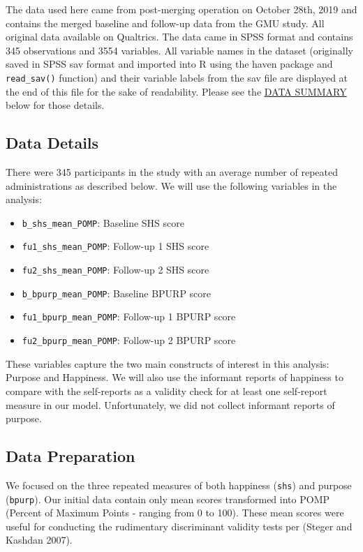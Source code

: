 \documentclass[
  letterpaper,
  DIV=11,
  numbers=noendperiod]{scrartcl}
\providecommand{\tightlist}{%
  \setlength{\itemsep}{0pt}\setlength{\parskip}{0pt}}\usepackage{longtable,booktabs,array}
\begin{document}
The data used here came from post-merging operation on October 28th,
2019 and contains the merged baseline and follow-up data from the GMU
study. All original data available on Qualtrics. The data came in SPSS
format and contains 345 observations and 3554 variables. All variable
names in the dataset (originally saved in SPSS sav format and imported
into R using the haven package and \texttt{read\_sav()} function) and
their variable labels from the sav file are displayed at the end of this
file for the sake of readability. Please see the
\hyperref[data-summary]{DATA SUMMARY} below for those details.

\subsection{Data Details}\label{data-details}

There were 345 participants in the study with an average number of
repeated administrations as described below. We will use the following
variables in the analysis:

\begin{itemize}
\tightlist
\item
  \texttt{b\_shs\_mean\_POMP}: Baseline SHS score
\item
  \texttt{fu1\_shs\_mean\_POMP}: Follow-up 1 SHS score
\item
  \texttt{fu2\_shs\_mean\_POMP}: Follow-up 2 SHS score
\item
  \texttt{b\_bpurp\_mean\_POMP}: Baseline BPURP score
\item
  \texttt{fu1\_bpurp\_mean\_POMP}: Follow-up 1 BPURP score
\item
  \texttt{fu2\_bpurp\_mean\_POMP}: Follow-up 2 BPURP score
\end{itemize}

These variables capture the two main constructs of interest in this
analysis: Purpose and Happiness. We will also use the informant reports
of happiness to compare with the self-reports as a validity check for at
least one self-report measure in our model. Unfortunately, we did not
collect informant reports of purpose.

\subsection{Data Preparation}\label{data-preparation}

We focused on the three repeated measures of both happiness
(\texttt{shs}) and purpose (\texttt{bpurp}). Our initial data contain
only mean scores transformed into POMP (Percent of Maximum Points -
ranging from 0 to 100). These mean scores were useful for conducting the
rudimentary discriminant validity tests per (Steger and Kashdan 2007).
\end{document}
